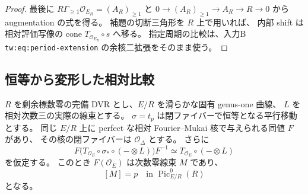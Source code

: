 \begin{proof}
最後に $R\Gamma_{\ge1}\mathcal O_{E_R}=(A_R)_{\ge1}$ と
$0\to(A_R)_{\ge1}\to A_R\to R\to0$ から augmentation の式を得る。
補題の切断三角形を $R$ 上で用いれば、
内部 shift は相対評価写像の cone
$T_{\mathcal O_{E_R}}\circ s$ へ移る。
指定周期の比較は、入力B \texttt{tw:eq:period-extension} の余核二拡張をそのまま使う。
\end{proof}

\subsection{恒等から変形した相対比較}

\begin{lemma}
\label{lem:nfm-formal-elliptic-point-line}
$R$ を剰余標数零の完備 DVR とし、$E/R$ を滑らかな固有 genus-one 曲線、
$L$ を相対次数三の実際の線束とする。
$\sigma=t_p$ は閉ファイバーで恒等となる平行移動とする。
同じ $E/R$ 上に perfect な相対 Fourier--Mukai 核で与えられる同値 $F$ があり、
その核の閉ファイバーは $\mathcal O_\Delta$ とする。
さらに
\begin{equation}
\label{eq:nfm-formal-elliptic-intertwining}
 F\bigl(T_{\mathcal O_E}\circ\sigma_*\circ(-\otimes L)\bigr)F^{-1}
 \simeq T_{\mathcal O_E}\circ(-\otimes L)
\end{equation}
を仮定する。
このとき $F(\mathcal O_E)$ は次数零線束 $M$ であり、
\begin{equation}
\label{eq:nfm-formal-point-line-class}
 [M]=p\quad\text{in }\operatorname{Pic}^0_{E/R}(R)
\end{equation}
となる。
\end{lemma}

